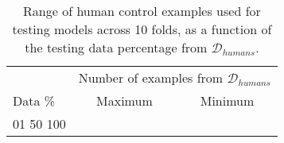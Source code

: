 \begin{table}[ht!]
\centering
 \caption{Range of human control examples used for testing models across 10 folds, as a function of the testing data percentage from $\mathcal{D}_{humans}$.}
 \label{tab:size_test_2}
\begin{tabular}{lcc}
\toprule
 &  \multicolumn{2}{c}{Number of examples from $\mathcal{D}_{humans}$}  \\
\cmidrule(lr){2-3}
Data \%  & Maximum & Minimum \\
\midrule
01%
50%
100%
\bottomrule
\end{tabular}
\end{table}
